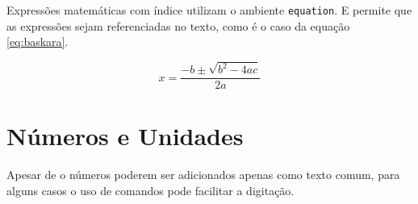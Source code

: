 
    Expressões matemáticas com índice utilizam o ambiente \lstinline[language=TeX,style=code]|equation|.
    E permite que as expressões sejam referenciadas no texto, como é o caso da equação \ref{eq:baskara}.

    \begin{equation}
        x = \frac{-b \pm \sqrt{b^2 - 4ac}}{2a}
        \label{eq:baskara}
    \end{equation}


\section{Números e Unidades}
\label{sec:numerosunidades}

    Apesar de o números poderem ser adicionados apenas como texto comum, para alguns casos o uso de comandos pode facilitar a digitação.


